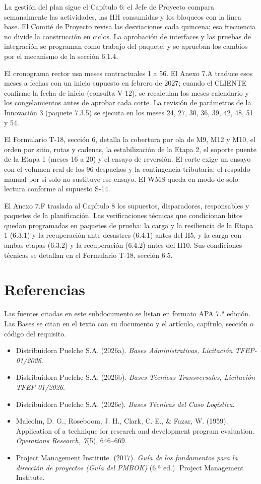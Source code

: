 La gestión del plan sigue el Capítulo 6: el Jefe de Proyecto compara semanalmente las actividades, las HH consumidas y los bloqueos con la línea base. El Comité de Proyecto revisa las desviaciones cada quincena; esa frecuencia no divide la construcción en ciclos. La aprobación de interfaces y las pruebas de integración se programan como trabajo del paquete, y se aprueban los cambios por el mecanismo de la sección 6.1.4.

El cronograma rector usa meses contractuales 1 a 56. El Anexo 7.A traduce esos meses a fechas con un inicio supuesto en febrero de 2027; cuando el CLIENTE confirme la fecha de inicio (consulta V-12), se recalculan los meses calendario y los congelamientos antes de aprobar cada corte. La revisión de parámetros de la Innovación 3 (paquete 7.3.5) se ejecuta en los meses 24, 27, 30, 36, 39, 42, 48, 51 y 54.

El Formulario T-18, sección 6, detalla la cobertura por ola de M9, M12 y M10, el orden por sitio, rutas y cadenas, la estabilización de la Etapa 2, el soporte puente de la Etapa 1 (meses 16 a 20) y el ensayo de reversión. El corte exige un ensayo con el volumen real de los 96 despachos y la contingencia tributaria; el respaldo manual por sí solo no sustituye ese ensayo. El WMS queda en modo de solo lectura conforme al supuesto S-14.

El Anexo 7.F traslada al Capítulo 8 los supuestos, disparadores, responsables y paquetes de la planificación. Las verificaciones técnicas que condicionan hitos quedan programadas en paquetes de prueba: la carga y la resiliencia de la Etapa 1 (6.3.1) y la recuperación ante desastres (6.4.1) antes del H5, y la carga con ambas etapas (6.3.2) y la recuperación (6.4.2) antes del H10. Sus condiciones técnicas se detallan en el Formulario T-18, sección 6.5.

\clearpage
\section*{Referencias}
{}

Las fuentes citadas en este subdocumento se listan en formato APA 7.ª edición. Las Bases se citan en el texto con su documento y el artículo, capítulo, sección o código del requisito.

\begin{itemize}
\item Distribuidora Puelche S.A. (2026a). \emph{Bases Administrativas, Licitación TFEP-01/2026}.
\item Distribuidora Puelche S.A. (2026b). \emph{Bases Técnicas Transversales, Licitación TFEP-01/2026}.
\item Distribuidora Puelche S.A. (2026c). \emph{Bases Técnicas del Caso Logística}.
\item Malcolm, D. G., Roseboom, J. H., Clark, C. E., \& Fazar, W. (1959). Application of a technique for research and development program evaluation. \emph{Operations Research, 7}(5), 646–669.
\item Project Management Institute. (2017). \emph{Guía de los fundamentos para la dirección de proyectos (Guía del PMBOK)} (6.ª ed.). Project Management Institute.

\end{itemize}

